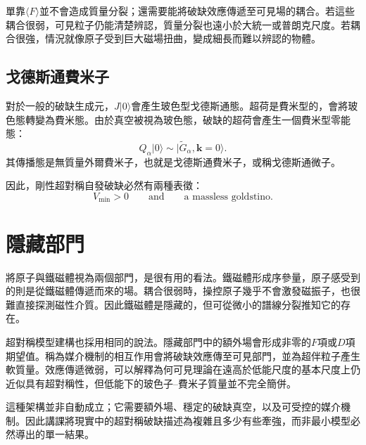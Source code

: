 單靠\(\langle F\rangle\)並不會造成質量分裂；還需要能將破缺效應傳遞至可見場的耦合。若這些耦合很弱，可見粒子仍能清楚辨認，質量分裂也遠小於大統一或普朗克尺度。若耦合很強，情況就像原子受到巨大磁場扭曲，變成細長而難以辨認的物體。

\subsection{戈德斯通費米子}

對於一般的破缺生成元，\(J|0\rangle\)會產生玻色型戈德斯通態。超荷是費米型的，會將玻色態轉變為費米態。由於真空被視為玻色態，破缺的超荷會產生一個費米型零能態：
\begin{equation}
Q_\alpha|0\rangle
\sim
|\widetilde G_\alpha,\mathbf k=0\rangle.
\label{eq:l9-goldstino}
\end{equation}
其傳播態是無質量外爾費米子，也就是戈德斯通費米子，或稱戈德斯通微子。

\begin{classroomqa}
\end{classroomqa}

因此，剛性超對稱自發破缺必然有兩種表徵：
\begin{equation}
\boxed{
V_{\min}>0
\qquad\text{and}\qquad
\text{a massless goldstino}.
}
\label{eq:l9-rigid-breaking-signatures}
\end{equation}

\section{隱藏部門}

將原子與鐵磁體視為兩個部門，是很有用的看法。鐵磁體形成序參量，原子感受到的則是從鐵磁體傳遞而來的場。耦合很弱時，操控原子幾乎不會激發磁振子，也很難直接探測磁性介質。因此鐵磁體是隱藏的，但可從微小的譜線分裂推知它的存在。

超對稱模型建構也採用相同的說法。隱藏部門中的額外場會形成非零的\(F\)項或\(D\)項期望值。稱為媒介機制的相互作用會將破缺效應傳至可見部門，並為超伴粒子產生軟質量。效應傳遞微弱，可以解釋為何可見理論在遠高於低能尺度的基本尺度上仍近似具有超對稱性，但低能下的玻色子--費米子質量並不完全簡併。

這種架構並非自動成立；它需要額外場、穩定的破缺真空，以及可受控的媒介機制。因此講課將現實中的超對稱破缺描述為複雜且多少有些牽強，而非最小模型必然導出的單一結果。

